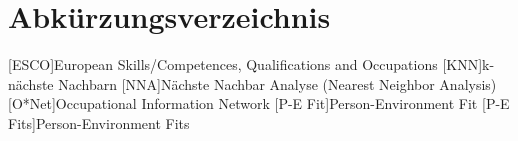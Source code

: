 \renewcommand{\chaptermark}[1]{\markboth{\spacedlowsmallcaps{#1}}{\spacedlowsmallcaps{#1}}}
\renewcommand{\sectionmark}[1]{\markright{\thesection\enspace\spacedlowsmallcaps{#1}}}
\chapter*{Abk\"{u}rzungsverzeichnis}

\begin{acronym}[UML]
	[ESCO]{European Skills/Competences, Qualifications and Occupations}
	[KNN]{k-nächste Nachbarn}
	[NNA]{Nächste Nachbar Analyse (Nearest Neighbor Analysis)}
	[O*Net]{Occupational Information Network}
	[P-E Fit]{Person-Environment Fit}
	[P-E Fits]{Person-Environment Fits}
	
\end{acronym}

\cleardoublepage
